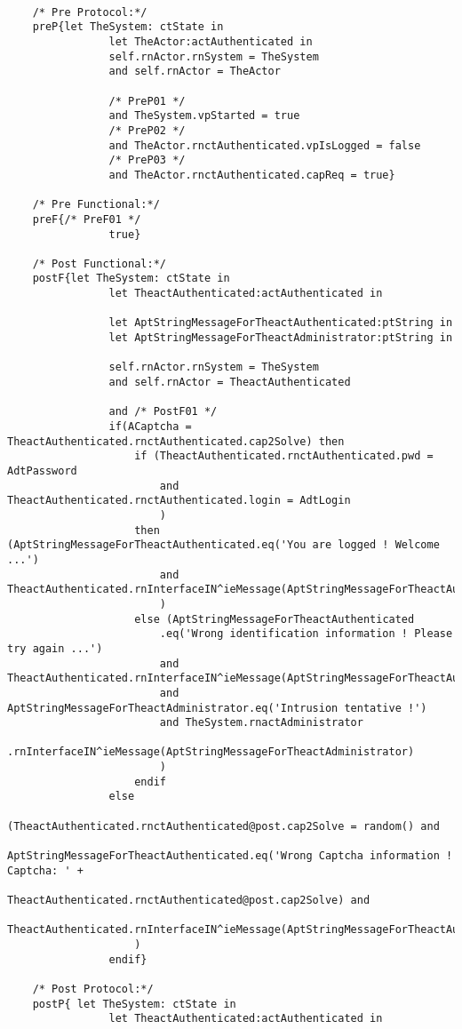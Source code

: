 	\scriptsize
	\vspace{0.5cm}
	\begin{lstlisting}[style=MessirStyle,firstnumber=auto,captionpos=b,caption={\msrmessir (MCL-oriented) specification of the operation \emph{oeLoginWithCaptcha}.},label=OM-actAuthenticated-oeLoginWithCaptcha-MCL-LST]

	/* Pre Protocol:*/ 
	preP{let TheSystem: ctState in
				let TheActor:actAuthenticated in
				self.rnActor.rnSystem = TheSystem
				and self.rnActor = TheActor
				
				/* PreP01 */
				and TheSystem.vpStarted = true
				/* PreP02 */
				and TheActor.rnctAuthenticated.vpIsLogged = false
				/* PreP03 */
				and TheActor.rnctAuthenticated.capReq = true}
	
	/* Pre Functional:*/
	preF{/* PreF01 */
				true}
	
	/* Post Functional:*/ 
	postF{let TheSystem: ctState in
				let TheactAuthenticated:actAuthenticated in
				
				let AptStringMessageForTheactAuthenticated:ptString in
				let AptStringMessageForTheactAdministrator:ptString in
				
				self.rnActor.rnSystem = TheSystem
				and self.rnActor = TheactAuthenticated
				
				and /* PostF01 */
				if(ACaptcha = TheactAuthenticated.rnctAuthenticated.cap2Solve) then
					if (TheactAuthenticated.rnctAuthenticated.pwd = AdtPassword
						and TheactAuthenticated.rnctAuthenticated.login = AdtLogin
						)
					then (AptStringMessageForTheactAuthenticated.eq('You are logged ! Welcome ...')
						and TheactAuthenticated.rnInterfaceIN^ieMessage(AptStringMessageForTheactAuthenticated)
						)
					else (AptStringMessageForTheactAuthenticated
						.eq('Wrong identification information ! Please try again ...')
						and TheactAuthenticated.rnInterfaceIN^ieMessage(AptStringMessageForTheactAuthenticated)
						and AptStringMessageForTheactAdministrator.eq('Intrusion tentative !')
						and TheSystem.rnactAdministrator
						.rnInterfaceIN^ieMessage(AptStringMessageForTheactAdministrator)
						)
					endif
				else
					(TheactAuthenticated.rnctAuthenticated@post.cap2Solve = random() and
						AptStringMessageForTheactAuthenticated.eq('Wrong Captcha information ! Captcha: ' +
							TheactAuthenticated.rnctAuthenticated@post.cap2Solve) and
						TheactAuthenticated.rnInterfaceIN^ieMessage(AptStringMessageForTheactAuthenticated)
					)
				endif}
	
	/* Post Protocol:*/ 
	postP{ let TheSystem: ctState in
				let TheactAuthenticated:actAuthenticated in
				

\end{lstlisting}
